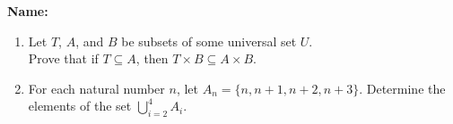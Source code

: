 \documentclass[12pt]{article}
\newcommand{\points}[1]{\marginpar{\hspace{24pt}[#1]}}
\begin{document}
{\bf Name:}
\thispagestyle{fancy}

\bigskip

\begin{enumerate}
 \item Let $T$, $A$, and $B$ be subsets of some universal set $U$. \\
 Prove that if $T\subseteq A$, then $T\times B\subseteq A\times B$. \points{5}

\vspace{4in}

 \item For each natural number $n$, let $A_n=\{n,n+1,n+2,n+3\}$. Determine the elements of the set $\displaystyle\bigcup_{i=2}^4 A_i$. \points{5}
\end{enumerate}
\end{document}
